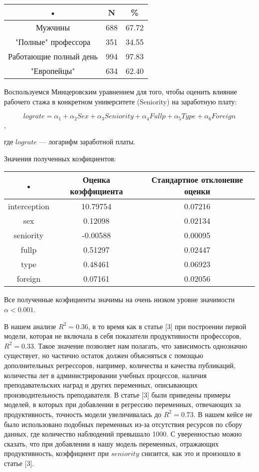 \documentclass[a4paper, 12pt]{article}
\theoremstyle{definition}
\theoremstyle{plain}
\begin{document}
\begin{center}
\begin{tabular}{|c|c|c|}
\hline 
• & N & \% \\ 
\hline 
Мужчины & 688 & 67.72 \\ 
\hline 
"Полные" профессора & 351 & 34.55 \\ 
\hline 
Работающие полный день & 994 & 97.83 \\ 
\hline 
"Европейцы" & 634 & 62.40 \\ 
\hline 
\end{tabular} 
\end{center}

Воспользуемся Минцеровским уравнением для того, чтобы оценить влияние рабочего стажа в конкретном университете (Seniority) на заработную плату:

$$lograte=\alpha_1+\alpha_2 Sex+\alpha_3 Seniority +\alpha_4 Fullp+\alpha_5 Type +\alpha_6 Foreign$$, 

где $lograte$ --- логарифм заработной платы.

Значения полученных коэфициентов:

\begin{center}
\begin{tabular}{|c|c|c|}
\hline 
• & Оценка коэффициента & Стандартное отклонение оценки \\ 
\hline 
interception & 10.79754 & 0.07216 \\ 
\hline 
sex & 0.12098 & 0.02134 \\ 
\hline 
seniority & -0.00588 & 0.00095 \\ 
\hline 
fullp & 0.51297 & 0.02447 \\ 
\hline 
type & 0.48461 & 0.06923 \\ 
\hline 
foreign & 0.07161 & 0.02056 \\ 
\hline 
\end{tabular} 
\end{center}

Все полученные коэфициенты значимы на очень низком уровне значимости $\alpha<0.001$.

В нашем анализе $R^2=0.36$, в то время как в статье [3] при построении первой модели, которая не включала в себя показатели продуктивности профессоров, $R^2=0.33$. Такое значение позволяет нам полагать, что зависимость однозначно существует, но частично остаток должен объясняться с помощью дополнительных регрессоров, например, количества и качества публикаций, количества лет в администрировании учебных процессов, наличия преподавательских наград и других переменных, описывающих производительность преподавателя. В статье [3] были приведены примеры моделей, в которых при добавлении в регрессию  переменных, отвечающих за продуктивность, точность модели увеличивалась до $R^2=0.73$. В нашем кейсе не было использовано подобных переменных из-за отсутствия ресурсов по сбору данных, где количество наблюдений превышало 1000. С уверенностью можно сказать, что при добавлении в нашу модель переменных, отражающих продуктивность, коэффициент при $seniority$ снизится, как это и произошло в статье [3]. 
\end{document}
